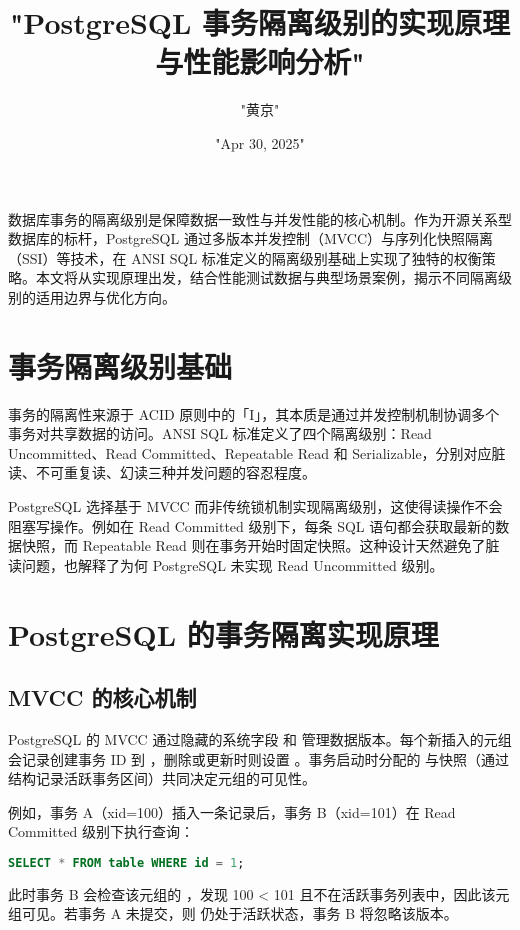 \title{"PostgreSQL 事务隔离级别的实现原理与性能影响分析"}
\author{"黄京"}
\date{"Apr 30, 2025"}
\maketitle
数据库事务的隔离级别是保障数据一致性与并发性能的核心机制。作为开源关系型数据库的标杆，PostgreSQL 通过多版本并发控制（MVCC）与序列化快照隔离（SSI）等技术，在 ANSI SQL 标准定义的隔离级别基础上实现了独特的权衡策略。本文将从实现原理出发，结合性能测试数据与典型场景案例，揭示不同隔离级别的适用边界与优化方向。\par
\chapter{事务隔离级别基础}
事务的隔离性来源于 ACID 原则中的「I」，其本质是通过并发控制机制协调多个事务对共享数据的访问。ANSI SQL 标准定义了四个隔离级别：Read Uncommitted、Read Committed、Repeatable Read 和 Serializable，分别对应脏读、不可重复读、幻读三种并发问题的容忍程度。\par
PostgreSQL 选择基于 MVCC 而非传统锁机制实现隔离级别，这使得读操作不会阻塞写操作。例如在 Read Committed 级别下，每条 SQL 语句都会获取最新的数据快照，而 Repeatable Read 则在事务开始时固定快照。这种设计天然避免了脏读问题，也解释了为何 PostgreSQL 未实现 Read Uncommitted 级别。\par
\chapter{PostgreSQL 的事务隔离实现原理}
\section{MVCC 的核心机制}
PostgreSQL 的 MVCC 通过隐藏的系统字段  和  管理数据版本。每个新插入的元组会记录创建事务 ID 到 ，删除或更新时则设置 。事务启动时分配的  与快照（通过  结构记录活跃事务区间）共同决定元组的可见性。\par
例如，事务 A（xid=100）插入一条记录后，事务 B（xid=101）在 Read Committed 级别下执行查询：\par
\begin{lstlisting}[language=sql]
SELECT * FROM table WHERE id = 1;
\end{lstlisting}
此时事务 B 会检查该元组的 ，发现 100 < 101 且不在活跃事务列表中，因此该元组可见。若事务 A 未提交，则  仍处于活跃状态，事务 B 将忽略该版本。\par
